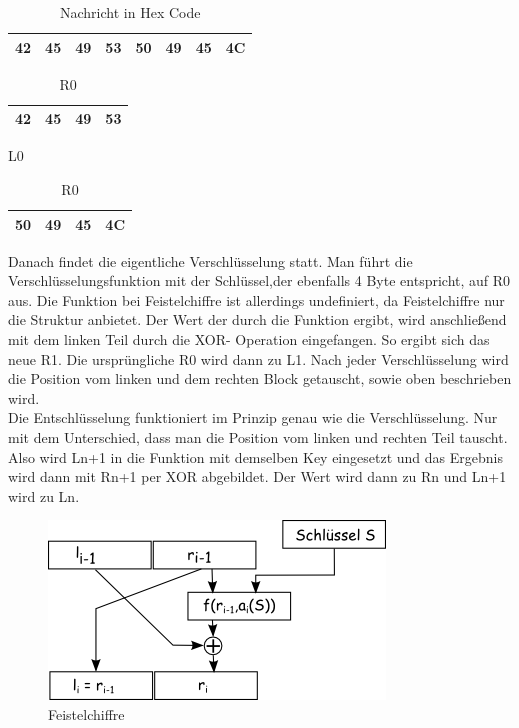 \documentclass[course=asp]{aspdoc}
\begin{document}
\begin{table}[H]
\centering
    \begin{tabular}{|l|l|l|l|l|l|l|l|}
        \hline
        42 & 45 & 49 & 53 & 50 & 49 & 45 & 4C   \\
        \hline
    \end{tabular}
    \caption{Nachricht in Hex Code}
\end{table}



\begin{table}[H]

    \begin{minipage}{.5\linewidth}

      \centering
        \begin{tabular}{|l|l|l|l|}
		\hline
            42 & 45 & 49 & 53   \\
		\hline
        \end{tabular}

	\caption{L0}
    \end{minipage}%
    \begin{minipage}{.5\linewidth}

 \centering

        \begin{tabular}{|l|l|l|l|}
           \hline
		 50 & 49 & 45 & 4C   \\
		\hline
        \end{tabular}
\caption{R0}
    \end{minipage}
\end{table}
Danach findet die eigentliche Verschlüsselung statt. Man führt die Verschlüsselungsfunktion mit der Schlüssel,der ebenfalls 4 Byte entspricht, auf R0 aus. Die Funktion bei Feistelchiffre ist allerdings undefiniert, da Feistelchiffre nur die Struktur anbietet. Der Wert der durch die Funktion ergibt, wird anschließend mit dem linken Teil durch die XOR- Operation eingefangen. So ergibt sich das neue R1. Die ursprüngliche R0 wird dann zu L1. Nach jeder Verschlüsselung wird die Position vom linken und dem rechten Block getauscht, sowie oben beschrieben wird.\\
Die Entschlüsselung funktioniert im Prinzip genau wie die Verschlüsselung. Nur mit dem Unterschied, dass man die Position vom linken und rechten Teil tauscht. Also wird Ln+1 in die Funktion mit demselben Key eingesetzt und das Ergebnis wird dann mit Rn+1 per XOR abgebildet. Der Wert wird dann zu Rn und Ln+1 wird zu Ln.

\begin{figure}[h]
\centering
\includegraphics[scale = 0.4]{feistel.png}
\caption{Feistelchiffre}
\end{figure}
\newpage
\end{document}
